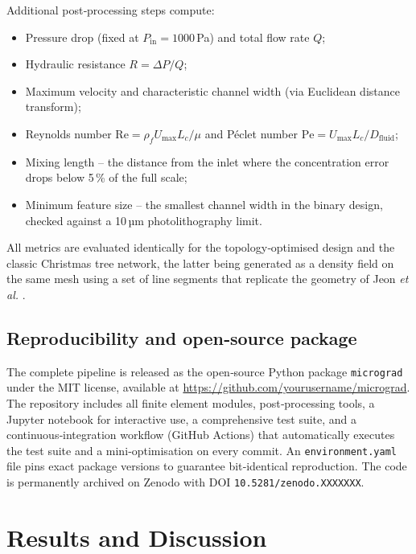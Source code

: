 \documentclass[12pt]{article}
\begin{document}
Additional post‑processing steps compute:
\begin{itemize}
\item Pressure drop (fixed at $P_{\text{in}} = 1000$ Pa) and total flow rate $Q$;
\item Hydraulic resistance $R = \Delta P / Q$;
\item Maximum velocity and characteristic channel width (via Euclidean distance transform);
\item Reynolds number $\mathrm{Re} = \rho_f U_{\max} L_c / \mu$ and Péclet number $\mathrm{Pe} = U_{\max} L_c / D_{\text{fluid}}$;
\item Mixing length – the distance from the inlet where the concentration error drops below 5 \% of the full scale;
\item Minimum feature size – the smallest channel width in the binary design, checked against a 10 µm photolithography limit.
\end{itemize}
All metrics are evaluated identically for the topology‑optimised design and the classic Christmas tree network, the latter being generated as a density field on the same mesh using a set of line segments that replicate the geometry of Jeon \textit{et al.} \cite{jeon2005}.

\subsection{Reproducibility and open‑source package}
The complete pipeline is released as the open‑source Python package \texttt{micrograd} under the MIT license, available at \url{https://github.com/yourusername/micrograd}. The repository includes all finite element modules, post‑processing tools, a Jupyter notebook for interactive use, a comprehensive test suite, and a continuous‑integration workflow (GitHub Actions) that automatically executes the test suite and a mini‑optimisation on every commit. An \texttt{environment.yaml} file pins exact package versions to guarantee bit‑identical reproduction. The code is permanently archived on Zenodo with DOI \texttt{10.5281/zenodo.XXXXXXX}.

\section{Results and Discussion}
\label{sec:results}
\end{document}
